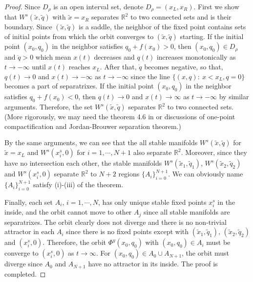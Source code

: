 \documentclass[11pt,reqno]{amsart}
\begin{document}
\begin{proof}

Since $D_\rho$ is an open interval set, denote $D_\rho=(x_L,x_R)$. First we show that $W^s(\tilde{x},\tilde{q})$ with $\tilde{x}=x_R$ separates $\mathbb{R}^2$ to two connected sets and is their boundary. Since $(\tilde{x},\tilde{q})$ is a saddle, the neighbor of the fixed point contains sets of initial points from which the orbit converges to $(\tilde{x},\tilde{q})$ starting. If the initial point $(x_0,q_0)$ in the neighbor satisfies $q_0+f(x_0)>0$, then $(x_0,q_0)\in D_\rho$ and $\dot{q}>0$ which mean $x(t)$ decreases and $q(t)$ increases monotonically as $t\to-\infty$ until $x(t)$ reaches $x_L$. After that, $\dot{q}$ becomes negative, so that, $q(t)\to0$ and $x(t)\to-\infty$ as $t\to-\infty$ since the line $\{(x,q):\ x<x_L, q=0\}$ becomes a part of separatrixes. If the initial point $(x_0,q_0)$ in the neighbor satisfies $q_0+f(x_0)<0$, then $q(t)\to0$ and $x(t)\to\infty$ as $t\to-\infty$ by similar arguments. Therefore, the set $W^s(\tilde{x},\tilde{q})$ separates $\mathbb{R}^2$ to two connected sets. (More rigorously, we may need the theorem 4.6 in \cite{Hirsch} or discussions of one-point compactification and Jordan-Brouwer separation theorem.)

By the same arguments, we can see that the all stable manifolds $W^s(\tilde{x},\tilde{q})$ for $\tilde{x}=x_L$ and $W^s(x_i^s,0)$ for $i=1,\cdots,N+1$ also separate $\mathbb{R}^2$. Moreover, since they have no intersection each other, the stable manifolds $W^s(\tilde{x}_1,\tilde{q}_1)$, $W^s(\tilde{x}_2,\tilde{q}_2)$ and $W^s(x_i^s,0)$ separate $\mathbb{R}^2$ to $N+2$ regions $\{A_i\}_{i=0}^{N+1}$. We can obviously name $\{A_i\}_{i=0}^{N+1}$ satisfy (i)-(iii) of the theorem.

Finally, each set $A_i$, $i=1,\cdots,N$, has only unique stable fixed points $x_i^s$ in the inside, and the orbit cannot move to other $A_j$  since all stable manifolds are separatrixes. The orbit clearly does not diverge and there is no non-trivial attractor in each $A_i$ since there is no fixed points except with $(\tilde{x}_1,\tilde{q}_1)$, $(\tilde{x}_2,\tilde{q}_2)$ and $(x_i^s,0)$. Therefore, the orbit $\Phi^y(x_0,q_0)$ with $(x_0,q_0)\in A_i$ must be converge to $(x_i^s,0)$ as $t\to\infty$. For $(x_0,q_0)\in A_0\cup A_{N+1}$, the orbit must diverge since $A_0$ and $A_{N+1}$ have no attractor in its inside. The proof is completed.

\end{proof}
\end{document}
